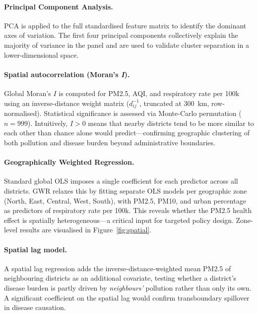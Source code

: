 \documentclass{article}
\begin{document}
\paragraph{Principal Component Analysis.}
PCA is applied to the full standardised feature matrix to identify the dominant axes of
variation. The first four principal components collectively explain the majority of
variance in the panel and are used to validate cluster separation in a lower-dimensional
space.

\paragraph{Spatial autocorrelation (Moran's \textit{I}).}
Global Moran's $I$ is computed for PM2.5, AQI, and respiratory rate per 100k using an
inverse-distance weight matrix ($d_{ij}^{-1}$, truncated at 300~km, row-normalised).
Statistical significance is assessed via Monte-Carlo permutation ($n = 999$). Intuitively,
$I > 0$ means that nearby districts tend to be more similar to each other than chance
alone would predict---confirming geographic clustering of both pollution and disease
burden beyond administrative boundaries.

\paragraph{Geographically Weighted Regression.}
Standard global OLS imposes a single coefficient for each predictor across all districts.
GWR relaxes this by fitting separate OLS models per geographic zone (North, East, Central,
West, South), with PM2.5, PM10, and urban percentage as predictors of respiratory rate per
100k. This reveals whether the PM2.5 health effect is spatially heterogeneous---a critical
input for targeted policy design. Zone-level results are visualised in
Figure~\ref{fig:spatial}.

\paragraph{Spatial lag model.}
A spatial lag regression adds the inverse-distance-weighted mean PM2.5 of neighbouring
districts as an additional covariate, testing whether a district's disease burden is
partly driven by \emph{neighbours'} pollution rather than only its own. A significant
coefficient on the spatial lag would confirm transboundary spillover in disease causation.
\end{document}
